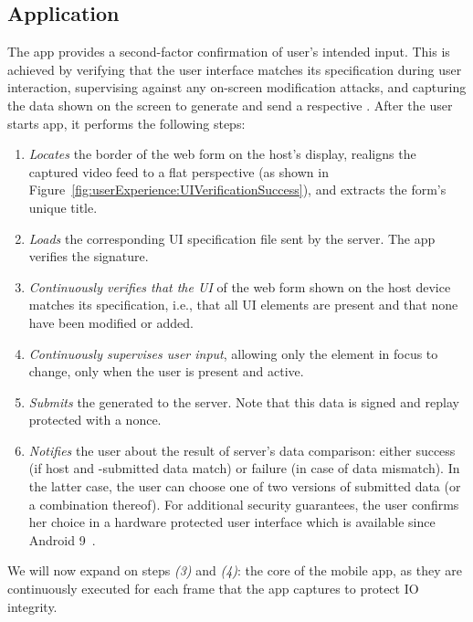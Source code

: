\subsection{\sysname Application} 
\label{sec:systemDesign:phone}

The app provides a second-factor confirmation of user's intended input. This is achieved by verifying that the user interface matches its specification during user interaction, supervising against any on-screen modification attacks, and capturing the data shown on the screen to generate and send a respective \POI. After the user starts \sysname app, it performs the following steps:

\begin{enumerate}
    \item \emph{Locates} the border of the web form on the host's display, realigns the captured video feed to a flat perspective (as shown in Figure~\ref{fig:userExperience:UIVerificationSuccess}), and extracts the form's unique title.
    \item \emph{Loads} the corresponding UI specification file sent by the server. The app verifies the signature.
    \item \emph{Continuously verifies that the UI} of the web form shown on the host device matches its specification, i.e., that all UI elements are present and that none have been modified or added.
    \item \emph{Continuously supervises user input}, allowing only the element in focus to change, only when the user is present and active.
	\item \emph{Submits} the generated \POI to the server. Note that this data is signed and replay protected with a nonce.
    \item \emph{Notifies} the user about the result of server's data comparison: either success (if host and \md -submitted data match) or failure (in case of data mismatch). In the latter case, the user can choose one of two versions of submitted data (or a combination thereof). For additional security guarantees, the user confirms her choice in a hardware protected user interface which is available since Android 9~\cite{androidConfirmation}.
\end{enumerate}

We will now expand on steps \emph{(3)} and \emph{(4)}: the core of the \name mobile app, as they are continuously executed for each frame that the app captures to protect IO integrity.


